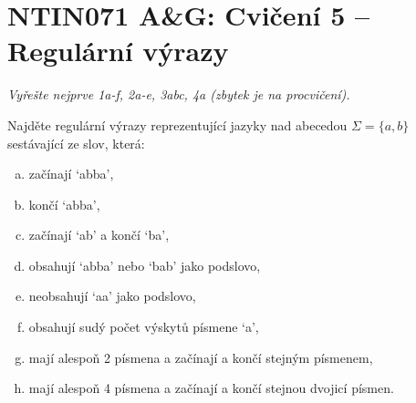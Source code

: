 \documentclass[a4paper,12pt]{amsart}
\begin{document}

\section*{NTIN071 A\&G: Cvičení 5 -- Regulární výrazy}


\medskip

\noindent\emph{Vyřešte nejprve 1a-f, 2a-e, 3abc, 4a (zbytek je na procvičení).}

\medskip

\medskip\begin{problem}

    Najděte regulární výrazy reprezentující jazyky nad abecedou $\Sigma = \{a, b\}$ sestávající ze slov, která:

    \medskip
    
    \begin{multicols}{2}
    
        \begin{enumerate}[(a)]\setlength\itemsep{12pt}
            \item začínají `abba',
            \item končí  `abba',
            \item začínají `ab' a končí `ba',
            \item obsahují `abba' nebo `bab' jako podslovo,
            \item neobsahují `aa' jako podslovo,
            \item obsahují sudý počet výskytů písmene `a',
            \item mají alespoň 2 písmena a začínají a končí stejným písmenem,
            \item mají alespoň 4 písmena a začínají a končí stejnou dvojicí písmen.
        \end{enumerate}

    \end{multicols}

\end{problem}
    
\end{document}
